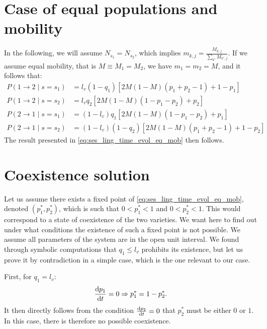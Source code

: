 \documentclass[../thesis.tex]{subfiles}
\begin{document}


\section*{Case of equal populations and mobility}
In the following, we will assume $N_{s_1} = N_{s_2}$, which implies $m_{k, j} =
\frac{M_{k, j}}{\sum_{k'} M_{k', j}}$. If we assume equal mobility, that is $M \equiv
M_1 = M_2$, we have $m_1 = m_2 = M$, and it follows that:
\begin{equation}
    \begin{aligned}
        P(1 \rightarrow 2 \mid s = s_1)
            &= l_v (1 - q_1)
            \left[
                2 M (1 - M) (p_1 + p_2 - 1) + 1 - p_1
            \right]
        \\
        P(1 \rightarrow 2 \mid s = s_2)
            &= l_v q_2
            \left[
                2 M (1 - M) (1 - p_1 - p_2) + p_2
            \right]
        \\
        P(2 \rightarrow 1 \mid s = s_1)
            &= (1 - l_v) q_1
            \left[
                2 M (1 - M) (1 - p_1 - p_2) + p_1
            \right]
        \\
        P(2 \rightarrow 1 \mid s = s_2)
            &= (1 - l_v) (1 - q_2)
            \left[
                2 M (1 - M) (p_1 + p_2 - 1) + 1 - p_2
            \right]
    \end{aligned}
\end{equation}
The result presented in \cref{eq:ses_ling_time_evol_eq_mob} then follows.


\section*{Coexistence solution}
\label{sec:appendix_coex_sol_ses_model}
Let us assume there exists a fixed point of \cref{eq:ses_ling_time_evol_eq_mob}, denoted
$(p_1^*, p_2^*)$, which is such that $0 < p_1^* < 1$ and $0 < p_2^* < 1$. This would
correspond to a state of coexistence of the two varieties. We want here to find out
under what conditions the existence of such a fixed point is not possible. We assume all
parameters of the system are in the open unit interval. We found through symbolic
computations that $q_1 \leq l_v$ prohibits its existence, but let us prove it by
contradiction in a simple case, which is the one relevant to our case.

First, for $q_1 = l_v$:
\begin{equation}
    \dv{p_1}{t} = 0 \Rightarrow p_1^* = 1 - p_2^*.
\end{equation}
It then directly follows from the condition $\dv{p_2}{t} = 0$ that $p_2^*$ must be
either $0$ or $1$. In this case, there is therefore no possible coexistence.
\end{document}

